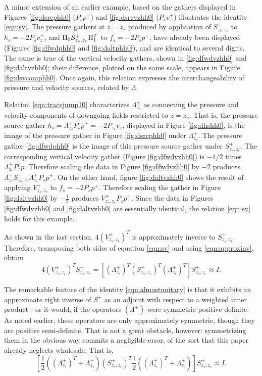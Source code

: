 A minor extension of an earlier example, based on the gathers
displayed in Figures \ref{fig:dsrcphh0} ($P_sp^+$) and
\ref{fig:dsrcvzhh0} ($P_sv_z^+$) illustrates the identity
\ref{eqn:sv}.
The pressure gathers at $z=z_r$ produced by application of
$S^+_{z_r,z_s}$ to $h_s=-2P_s v^+_z$, and $\Pi_0{\cal S}^+_{z_s,z_r}\Pi_1^T$ to $f_s
=-2P_sp^+$, have already been displayed (Figures \ref{fig:dfwdphh0}
and \ref{fig:daltphh0}), and are identical to several digits. The same 
is true of the vertical velocity gathers, shown in \ref{fig:dfwdvzhh0}
and \ref{fig:daltvzhh0}; their difference, plotted on the same scale,
appears in Figure \ref{fig:dsvcomphh0}. Once again, this relation
expresses the interchangeability of pressure and velocity sources,
related by $\Lambda$.

Relation \ref{eqn:tracejump10} characterizes
$\Lambda^+_{z_s}$ as connecting the pressure and velocity components
of downgoing fields restricted to $z=z_s$. That is, the pressure
source gather
$h_s=\Lambda^{+}_{z_s}P_s p^+ = -2
P_{z_s}v_z$, displayed in Figure \ref{fig:dhshh0}, is the image of the
pressure gather in Figure \ref{fig:dsrcphh0} under
$\Lambda^{+}_{z_s}$.
The pressure gather
\ref{fig:dfwdphh0} is the image of this pressure source gather under
$S^+_{z_s,z_r}$. The corresponding vertical velocity gather
(Figure \ref{fig:dfwdvzhh0}) is $-1/2$ times $\Lambda^+_{z_r}P_r
p$. Therefore scaling the data in Figure \ref{fig:dfwdvzhh0} by
$-2$ produces
$\Lambda^+_{z_r}S^+_{z_s,z_r}\Lambda^{+}_{z_s}P_s p^+$. On the other
hand, figure \ref{fig:daltvzhh0} shows the result of applying
$V^+_{z_s,z_r}$ to $f_s=-2P_s p^+$. Therefore scaling the gather in
Figure \ref{fig:daltvzhh0} by $-\frac{1}{2}$ produces $V^+_{z_s,z_r}P_zp^+$.
Since the data in Figures \ref{fig:dfwdvzhh0} and \ref{fig:daltvzhh0}
are essentially identical, the relation \ref{eqn:sv} holds for this
example.

As shown in the last section, $4(V_{z_s,z_r}^+)^T$ is approximately
inverse to $S^{+}_{z_s,z_r}$. Therefore, transposing both sides of
equation \ref{eqn:sv} and using \ref{eqn:approxinv}, obtain
\begin{equation}
  \label{eqn:almostunitary}
  4(V_{z_s,z_r}^+)^TS^+_{z_s,z_r} = [ (\Lambda^+_{z_s})^T
  (S^{+}_{z_s,z_r})^T(\Lambda^+_{z_r})^T]S^{+}_{z_s,z_r} \approx I.
\end{equation}

The remarkable feature of the identity \ref{eqn:almostunitary} is that
it exhibits an approximate right inverse of $S^+$ as an adjoint with
respect to a weighted inner product - or it would, if the operators
$(\Lambda^+)$ were symmetric positive definite. As noted earlier,
these operators are only approximately symmetric, though they are
positive semi-definite. That is not a great obstacle, however:
symmetrizing them in the obvious way commits a negligible error, of
the sort that this paper already neglects wholesale. That is,
\begin{equation}
  \label{eqn:unitary}
  [ \frac{1}{2}((\Lambda^+_{z_s})^T+ \Lambda^+_{z_s})
  (S^{+}_{z_s,z_r})^T \frac{1}{2}((\Lambda^+_{z_r})^T+
  \Lambda^+_{z_r})]S^{+}_{z_s,z_r} \approx I.
\end{equation}

